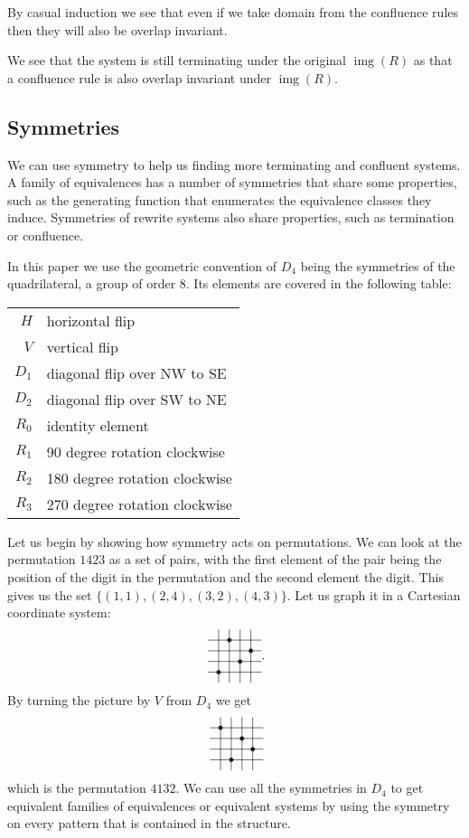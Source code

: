 \documentclass[a4paper, 11pt, english]{article}
\newcommand{\pattern}[4]{
  \raisebox{0.6ex}{
  \begin{tikzpicture}[scale=0.3, baseline=(current bounding box.center), #1]
    \foreach \x/\y in {#4}
      \fill[NE-lines] (\x,\y) rectangle +(1,1);
    \draw (0.01,0.01) grid (#2+0.99,#2+0.99);
    \foreach \x/\y in {#3}
      \filldraw (\x,\y) circle (5pt);
  \end{tikzpicture}}
}
\theoremstyle{definition}
\DeclareMathOperator{\img}{img}
\begin{document}
By casual induction we see that even if we take domain from the confluence rules
then they will also be overlap invariant.

We see that the system is still terminating under the original $\img(R)$ as
that a confluence rule is also overlap invariant under $\img(R)$.

\subsection{Symmetries}
We can use symmetry to help us finding more terminating and confluent systems. A family of
equivalences has a number of symmetries that share some properties, such as the generating
function that enumerates the equivalence classes they induce. Symmetries of rewrite systems also
share properties, such as termination or confluence.

In this paper we use the geometric convention of $D_4$ being the symmetries of the quadrilateral, a
group of order 8. Its elements are covered in the following table:

\begin{center}
\begin{tabular}{r|l}
  $H$ & horizontal flip \\
  $V$ & vertical flip \\
  $D_1$ & diagonal flip over NW to SE \\
  $D_2$ & diagonal flip over SW to NE \\
  $R_0$ & identity element \\
  $R_1$ & 90 degree rotation clockwise \\
  $R_2$ & 180 degree rotation clockwise \\
  $R_3$ & 270 degree rotation clockwise \\
\end{tabular}
\end{center}

Let us begin by showing how symmetry acts on permutations. We can look at the
permutation $1423$ as a set of pairs, with the first element of the pair being the position of the
digit in the permutation and the second element the digit. This gives us the set $\{(1,1), (2,4), (3,2), (4,3)\}$. Let us
graph it in a Cartesian coordinate system:
\[
\pattern{}{4}{1/1, 2/4, 3/2, 4/3}{}.
\]
By turning the picture by $V$ from $D_4$ we get
\[
\pattern{}{4}{1/4, 2/1, 3/3, 4/2}{}
\]
which is the permutation $4132$. 
We can use all the symmetries in $D_4$ to get equivalent families of equivalences or equivalent
systems by using the symmetry on every pattern that is contained in the structure.
\end{document}

